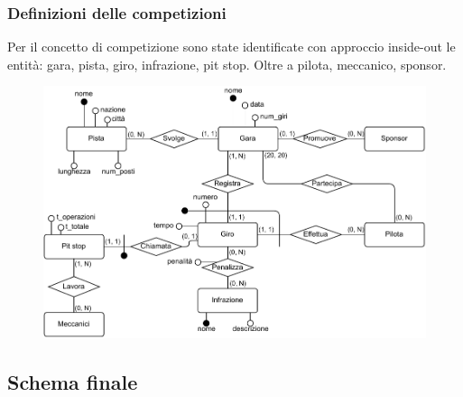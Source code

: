 \documentclass[11pt]{article}
\begin{document}
\subsubsection{Definizioni delle competizioni}
Per il concetto di competizione sono state identificate con approccio inside-out le entità: gara, pista, giro, infrazione, pit stop. Oltre a pilota, meccanico, sponsor.
\begin{figure}[H]
    \centering
    \includegraphics[width=15.5cm]{../er/gare_gara.pdf} %
\end{figure}                                            %

\subsection{Schema finale}
\begin{figure}[H]
    \centering
\end{figure}
\end{document}
